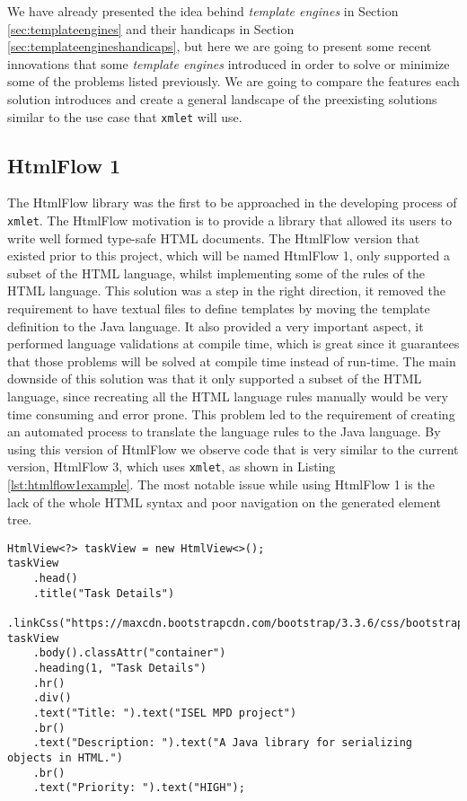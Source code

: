 We have already presented the idea behind \textit{template engines} in Section \ref{sec:templateengines} and their handicaps in Section  \ref{sec:templateengineshandicaps}, but here we are going to present some recent innovations that some \textit{template engines} introduced in order to solve or minimize some of the problems listed previously. We are going to compare the features each solution introduces and create a general landscape of the preexisting solutions similar to the use case that \texttt{xmlet} will use.

\subsection{HtmlFlow 1}
\label{sec:htmlflowbeforexmlet}

The HtmlFlow\cite{htmlflow} library was the first to be approached in the developing process of \texttt{xmlet}. The HtmlFlow motivation is to provide a library that allowed its users to write well formed type-safe \ac{HTML} documents. The HtmlFlow version that existed prior to this project, which will be named HtmlFlow 1, only supported a subset of the \ac{HTML} language, whilst implementing some of the rules of the \ac{HTML} language. This solution was a step in the right direction, it removed the requirement to have textual files to define templates by moving the template definition to the Java language. It also provided a very important aspect, it performed language validations at compile time, which is great since it guarantees that those problems will be solved at compile time instead of run-time. The main downside of this solution was that it only supported a subset of the \ac{HTML} language, since recreating all the \ac{HTML} language rules manually would be very time consuming and error prone. This problem led to the requirement of creating an automated process to translate the language rules to the Java language. By using this version of HtmlFlow we observe code that is very similar to the current version, HtmlFlow 3, which uses \texttt{xmlet}, as shown in Listing \ref{lst:htmlflow1example}. The most notable issue while using HtmlFlow 1 is the lack of the whole \ac{HTML} syntax and poor navigation on the generated element tree.

\bigskip


\begin{minipage}{\linewidth}
\begin{lstlisting}[caption={HtmlFlow Version 1 Code Example}, label={lst:htmlflow1example}]
HtmlView<?> taskView = new HtmlView<>();
taskView
    .head()
    .title("Task Details")
    .linkCss("https://maxcdn.bootstrapcdn.com/bootstrap/3.3.6/css/bootstrap.min.css");
taskView
    .body().classAttr("container")
    .heading(1, "Task Details")
    .hr()
    .div()
    .text("Title: ").text("ISEL MPD project")
    .br()
    .text("Description: ").text("A Java library for serializing objects in HTML.")
    .br()
    .text("Priority: ").text("HIGH");
\end{lstlisting}
\end{minipage}

